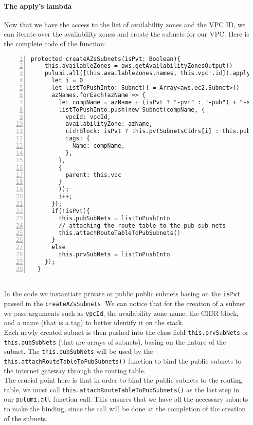 \paragraph{The apply's lambda}
Now that we have the access to the list of availability zones and the VPC ID, we can iterate over the availability zones and create the subnets for our VPC.
Here is the complete code of the function:
\begin{lstlisting}[numbers=left, numberstyle=\tiny, numbersep=-5pt, stepnumber=1]
  protected createAZsSubnets(isPvt: Boolean){
    this.availableZones = aws.getAvailabilityZonesOutput()
    pulumi.all([this.availableZones.names, this.vpc!.id]).apply(([azNames, vpcId]) => {
      let i = 0
      let listToPushInto: Subnet[] = Array<aws.ec2.Subnet>()
      azNames.forEach(azName => {
        let compName = azName + (isPvt ? "-pvt" : "-pub") + "-subnet-typescript"
        listToPushInto.push(new Subnet(compName, {
          vpcId: vpcId,
          availabilityZone: azName,
          cidrBlock: isPvt ? this.pvtSubnetsCidrs[i] : this.pubSubnetsCidrs[i],
          tags: {
            Name: compName,
          },
        },
        {
          parent: this.vpc
        }
        ));
        i++;
      });
      if(!isPvt){
        this.pubSubNets = listToPushInto
        // attaching the route table to the pub sub nets
        this.attachRouteTableToPubSubnets()
      }
      else
        this.prvSubNets = listToPushInto
    });
  }
\end{lstlisting}\mbox{}\\
In the code we instantiate private or public public subnets basing on the \texttt{isPvt} passed in the \texttt{createAZsSubnets}.
We can notice that for the creation of a subnet we pass arguments such as \texttt{vpcId}, the availability zone name, the CIDR block, and a name (that is a tag) to better identify it on the stack.\\
Each newly created subnet is then pushed into the class field \texttt{this.prvSubNets} or \texttt{this.pubSubNets} (that are arrays of subnets), basing on the nature of the subnet.
The \texttt{this.pubSubNets} will be used by the \texttt{this.attachRouteTableToPubSubnets()} function to bind the public subnets to the internet gateway through the routing table.\\
The crucial point here is that in order to bind the public subnets to the routing table, we must call \texttt{this.attachRouteTableToPubSubnets()} as the last step in our \texttt{pulumi.all} function call.
This ensures that we have all the necessary subnets to make the binding, since the call will be done at the completion of the creation of the subnets.

